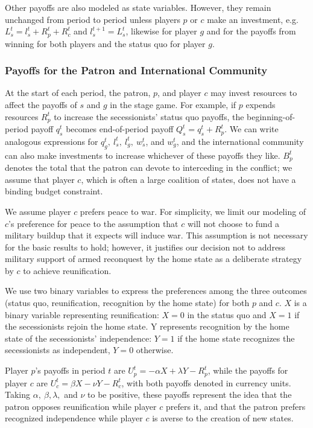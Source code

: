 \documentclass[11pt,letterpaper, notitlepage]{article}
\begin{document}
Other payoffs are also modeled as state variables. However, they remain unchanged from period to period unless players $p$ or $c$ make an investment, e.g. $L_s^t = l_s^t + R_p^t + R_c^t$ and $l_s^{t+1} = L_s^t$, likewise for player $g$ and for the payoffs from winning for both players and the status quo for player $g$. 


\subsubsection{Payoffs for the Patron and International Community}

At the start of each period, the patron, $p$, and player $c$ may invest resources to affect the payoffs of $s$ and $g$ in the stage game. For example, if $p$ expends resources $R_p^t$ to increase the secessionists' status quo payoffs, the beginning-of-period payoff $q_s^t$ becomes end-of-period payoff $Q_s^t = q_s^t + R_p^t$. We can write analogous expressions for $q_g^t, \ l_s^t,\ l_g^t,\ w_s^t$, and $w_g^t$, and the international community can also make investments to increase whichever of these payoffs they like. $B_p^t$ denotes the total that the patron can devote to interceding in the conflict; we assume that player $c$, which is often a large coalition of states, does not have a binding budget constraint.

We assume player $c$ prefers peace to war. For simplicity, we limit our modeling of $c$'s preference for peace to the assumption that $c$ will not choose to fund a military buildup that it expects will induce war. This assumption is not necessary for the basic results to hold; however, it justifies our decision not to address military support of armed reconquest by the home state as a deliberate strategy by $c$ to achieve reunification. 

We use two binary variables to express the preferences among the three outcomes (status quo, reunification, recognition by the home state) for both $p$ and $c$. $X$ is a binary variable representing reunification: $X=0$ in the status quo and $X=1$ if the secessionists rejoin the home state. Y represents recognition by the home state of the secessionists' independence: $Y=1$ if the home state recognizes the secessionists as independent, $Y=0$ otherwise. 

Player $p$'s payoffs in period $t$ are $U_p^t= -\alpha X+\lambda Y -R_p^t$, while the payoffs for player $c$ are $U_c^t= \beta X-\nu Y -R_c^t$, with both payoffs denoted in currency units. Taking $\alpha, \ \beta, \lambda,$ and $\nu$ to be positive, these payoffs represent the idea that the patron opposes reunification while player $c$ prefers it, and that the patron prefers recognized independence while player $c$ is averse to the creation of new states.
\end{document}
